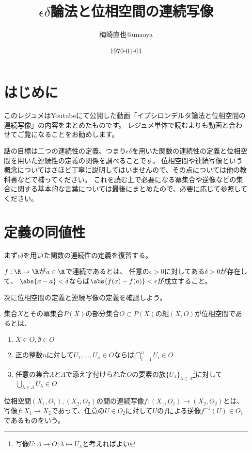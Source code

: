 \documentclass[uplatex]{jsarticle}
\title{$\epsilon\delta$論法と位相空間の連続写像}
\author{梅崎直也@unaoya}
\date{\today}
\begin{document}
\maketitle

\section{はじめに}
このレジュメはYoutubeにて公開した動画「イプシロンデルタ論法と位相空間の連続写像」の内容をまとめたものです。
レジュメ単体で読むよりも動画と合わせてご覧になることをお勧めします。

話の目標は二つの連続性の定義、つまり$\epsilon\delta$を用いた関数の連続性の定義と位相空間を用いた連続性の定義の関係を調べることです。
位相空間や連続写像という概念についてはさほど丁寧に説明してはいませんので、その点については他の教科書などで補ってください。
これを読む上で必要になる冪集合や逆像などの集合に関する基本的な言葉については最後にまとめたので、必要に応じて参照してください。

\section{定義の同値性}
まず$\epsilon\delta$を用いた関数の連続性の定義を復習する。

\begin{dfn}[関数の連続性]
  $f:\R \to \R$が$a\in\R$で連続であるとは、
  任意の$\epsilon>0$に対してある$\delta>0$が存在して、
  $\abs{x-a}<\delta$ならば$\abs{f(x)-f(a)}<\epsilon$が成立すること。
\end{dfn}

次に位相空間の定義と連続写像の定義を確認しよう。

\begin{dfn}[位相空間]
  集合$X$とその冪集合$P(X)$の部分集合$O\subset P(X)$の組$(X,O)$が位相空間であるとは、
  \begin{enumerate}
  \item $X\in O, \emptyset\in O$
  \item 正の整数$n$に対して$U_1,\ldots,U_n\in O$ならば$\bigcap_{i=1}^n U_i\in O$
  \item 任意の集合$\Lambda$と$\Lambda$で添え字付けられた$O$の要素の族$\{U_\lambda\}_{\lambda\in\Lambda}$\footnote{写像$U:\Lambda\to O; \lambda\mapsto U_\lambda$と考えればよい}に対して$\bigcup_{\lambda\in\Lambda}U_\lambda\in O$
  \end{enumerate}
\end{dfn}

\begin{dfn}[位相空間の間の連続写像]
  位相空間$(X_1,O_1), (X_2,O_2)$の間の連続写像$f:(X_1,O_1)\to(X_2,O_2)$とは、
  写像$f:X_1\to X_2$であって、任意の$U\in O_2$に対して$U$の$f$による逆像$f^{-1}(U)\in O_1$であるものをいう。
\end{dfn}
\end{document}
